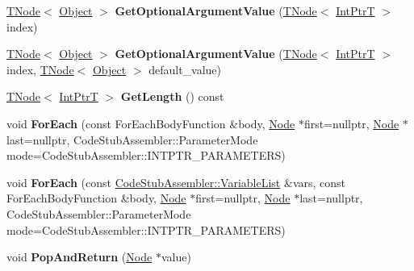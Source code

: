 \begin{DoxyCompactItemize}
\mbox{\hyperlink{classv8_1_1internal_1_1compiler_1_1TNode}{T\+Node}}$<$ \mbox{\hyperlink{classv8_1_1internal_1_1Object}{Object}} $>$ {\bfseries Get\+Optional\+Argument\+Value} (\mbox{\hyperlink{classv8_1_1internal_1_1compiler_1_1TNode}{T\+Node}}$<$ \mbox{\hyperlink{structv8_1_1internal_1_1IntPtrT}{Int\+PtrT}} $>$ index)
\item 
\mbox{\label{classv8_1_1internal_1_1CodeStubArguments_a71d89d3ce5b112e979ef926a7adc1c55}} 
\mbox{\hyperlink{classv8_1_1internal_1_1compiler_1_1TNode}{T\+Node}}$<$ \mbox{\hyperlink{classv8_1_1internal_1_1Object}{Object}} $>$ {\bfseries Get\+Optional\+Argument\+Value} (\mbox{\hyperlink{classv8_1_1internal_1_1compiler_1_1TNode}{T\+Node}}$<$ \mbox{\hyperlink{structv8_1_1internal_1_1IntPtrT}{Int\+PtrT}} $>$ index, \mbox{\hyperlink{classv8_1_1internal_1_1compiler_1_1TNode}{T\+Node}}$<$ \mbox{\hyperlink{classv8_1_1internal_1_1Object}{Object}} $>$ default\+\_\+value)
\item 
\mbox{\label{classv8_1_1internal_1_1CodeStubArguments_a4930dd030222fce47fd0e02cea3b5a44}} 
\mbox{\hyperlink{classv8_1_1internal_1_1compiler_1_1TNode}{T\+Node}}$<$ \mbox{\hyperlink{structv8_1_1internal_1_1IntPtrT}{Int\+PtrT}} $>$ {\bfseries Get\+Length} () const
\item 
\mbox{\label{classv8_1_1internal_1_1CodeStubArguments_a049e945530287312a08dfd2734d114c0}} 
void {\bfseries For\+Each} (const For\+Each\+Body\+Function \&body, \mbox{\hyperlink{classv8_1_1internal_1_1compiler_1_1Node}{Node}} $\ast$first=nullptr, \mbox{\hyperlink{classv8_1_1internal_1_1compiler_1_1Node}{Node}} $\ast$last=nullptr, Code\+Stub\+Assembler\+::\+Parameter\+Mode mode=Code\+Stub\+Assembler\+::\+I\+N\+T\+P\+T\+R\+\_\+\+P\+A\+R\+A\+M\+E\+T\+E\+RS)
\item 
\mbox{\label{classv8_1_1internal_1_1CodeStubArguments_a705d62e34dba758fc73dc34e496a6a7b}} 
void {\bfseries For\+Each} (const \mbox{\hyperlink{classv8_1_1internal_1_1ZoneVector}{Code\+Stub\+Assembler\+::\+Variable\+List}} \&vars, const For\+Each\+Body\+Function \&body, \mbox{\hyperlink{classv8_1_1internal_1_1compiler_1_1Node}{Node}} $\ast$first=nullptr, \mbox{\hyperlink{classv8_1_1internal_1_1compiler_1_1Node}{Node}} $\ast$last=nullptr, Code\+Stub\+Assembler\+::\+Parameter\+Mode mode=Code\+Stub\+Assembler\+::\+I\+N\+T\+P\+T\+R\+\_\+\+P\+A\+R\+A\+M\+E\+T\+E\+RS)
\item 
\mbox{\label{classv8_1_1internal_1_1CodeStubArguments_a20832421f90b0bd76f3c5dc1cb1145ce}} 
void {\bfseries Pop\+And\+Return} (\mbox{\hyperlink{classv8_1_1internal_1_1compiler_1_1Node}{Node}} $\ast$value)
\end{DoxyCompactItemize}


